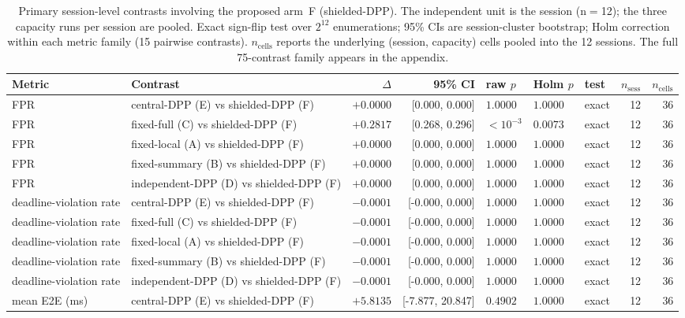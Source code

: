 \begin{table}[t]
\centering
\caption{Primary session-level contrasts involving the proposed arm~F (shielded-DPP). The independent unit is the session (n$=$12); the three capacity runs per session are pooled. Exact sign-flip test over $2^{12}$ enumerations; 95\% CIs are session-cluster bootstrap; Holm correction within each metric family (15 pairwise contrasts). $n_{\mathrm{cells}}$ reports the underlying (session, capacity) cells pooled into the 12 sessions. The full 75-contrast family appears in the appendix.}
\label{tab:contrasts}
\small
\begin{tabular}{llrrlllrr}
\toprule
Metric & Contrast & $\Delta$ & 95\% CI & raw $p$ & Holm $p$ & test & $n_{\mathrm{sess}}$ & $n_{\mathrm{cells}}$ \\
\midrule
FPR & central-DPP (E) vs shielded-DPP (F) & $+0.0000$ & [0.000, 0.000] & $1.0000$ & $1.0000$ & exact & 12 & 36 \\
FPR & fixed-full (C) vs shielded-DPP (F) & $+0.2817$ & [0.268, 0.296] & $<10^{-3}$ & $0.0073$ & exact & 12 & 36 \\
FPR & fixed-local (A) vs shielded-DPP (F) & $+0.0000$ & [0.000, 0.000] & $1.0000$ & $1.0000$ & exact & 12 & 36 \\
FPR & fixed-summary (B) vs shielded-DPP (F) & $+0.0000$ & [0.000, 0.000] & $1.0000$ & $1.0000$ & exact & 12 & 36 \\
FPR & independent-DPP (D) vs shielded-DPP (F) & $+0.0000$ & [0.000, 0.000] & $1.0000$ & $1.0000$ & exact & 12 & 36 \\
deadline-violation rate & central-DPP (E) vs shielded-DPP (F) & $-0.0001$ & [-0.000, 0.000] & $1.0000$ & $1.0000$ & exact & 12 & 36 \\
deadline-violation rate & fixed-full (C) vs shielded-DPP (F) & $-0.0001$ & [-0.000, 0.000] & $1.0000$ & $1.0000$ & exact & 12 & 36 \\
deadline-violation rate & fixed-local (A) vs shielded-DPP (F) & $-0.0001$ & [-0.000, 0.000] & $1.0000$ & $1.0000$ & exact & 12 & 36 \\
deadline-violation rate & fixed-summary (B) vs shielded-DPP (F) & $-0.0001$ & [-0.000, 0.000] & $1.0000$ & $1.0000$ & exact & 12 & 36 \\
deadline-violation rate & independent-DPP (D) vs shielded-DPP (F) & $-0.0001$ & [-0.000, 0.000] & $1.0000$ & $1.0000$ & exact & 12 & 36 \\
mean E2E (ms) & central-DPP (E) vs shielded-DPP (F) & $+5.8135$ & [-7.877, 20.847] & $0.4902$ & $1.0000$ & exact & 12 & 36 \\

\end{tabular}
\end{table}
